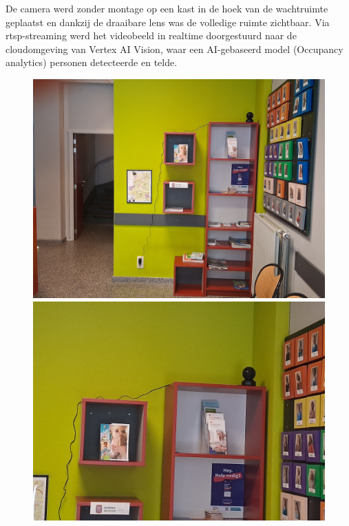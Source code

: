 De camera werd zonder montage op een kast in de hoek van de wachtruimte geplaatst en dankzij de draaibare lens was de volledige ruimte zichtbaar. Via \gls{rtsp}-streaming werd het videobeeld in realtime doorgestuurd naar de cloudomgeving van Vertex AI Vision, waar een AI-gebaseerd model (Occupancy analytics) personen detecteerde en telde. \\

\begin{figure}[h!]
    \centering
    \begin{minipage}[b]{0.49\textwidth}
        \includegraphics[width=\textwidth]{img/bp/vertex/camera-pic2.jpg}
    \end{minipage}
    \hfill
    \begin{minipage}[b]{0.49\textwidth}
        \includegraphics[width=\textwidth]{img/bp/vertex/camera-pic1.jpg}
    \end{minipage}
    

\end{figure}
